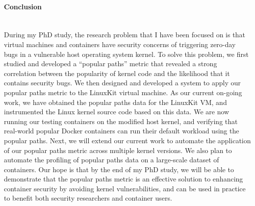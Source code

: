 \paragraph{Conclusion}\mbox{}\\

During my PhD study, the research problem that I have been focused on is that virtual machines and containers have security concerns of 
triggering zero-day bugs in a vulnerable host operating system kernel. To solve this problem, we first studied and developed a ``popular paths'' metric 
that revealed a strong correlation between the popularity of kernel code and the likelihood that it contains security bugs. We then designed and developed 
a system to apply our popular paths metric to the LinuxKit virtual machine. As our current on-going work, we have obtained the popular paths data for the LinuxKit VM, 
and instrumented the Linux kernel source code based on this data. We are now running our testing containers on the modified host kernel, and verifying that 
real-world popular Docker containers can run their default workload using the popular paths. Next, we will extend our current work to automate the application of our 
popular paths metric across multiple kernel versions. We also plan to automate the profiling of popular paths data on a large-scale dataset of containers. Our hope is that 
by the end of my PhD study, we will be able to demonstrate that the popular paths metric is an effective solution to enhancing container security by avoiding kernel vulnerabilities, 
and can be used in practice to benefit both security researchers and container users. 